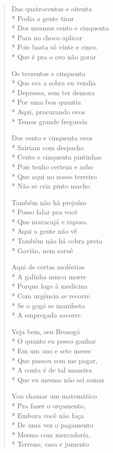 \begin{verse}
Das quatrocentas e oitenta\\*
Podia a gente tirar\\*
Dos mesmos cento e cinquenta\\*
Para no choco aplicar\\*
Pois basta só vinte e cinco\\*
Que é pra o ovo não gorar

Os trezentos e cinquenta\\*
Que era a sobra eu vendia\\*
Depressa, sem ter demora\\*
Por uma boa quantia\\*
Aqui, procurando ovos\\*
Temos grande freguesia

Dos cento e cinquenta ovos\\*
Sairiam com despacho\\*
Cento e cinquenta pintinhas\\*
Pois tenho certeza e acho\\*
Que aqui no nosso terreiro\\*
Não se cria pinto macho

Também não há prejuízo\\*
Posso falar pra você\\*
Que maracajá e raposa\\*
Aqui a gente não vê\\*
Também não há cobra preta\\*
Gavião, nem saruê

Aqui de certas moléstias\\*
A galinha nunca morre\\*
Porque logo à medicina\\*
Com urgência se recorre\\*
Se o gogó se manifesta\\*
A empregada socorre

Veja bem, seu Brosogó\\*
O quanto eu posso ganhar\\*
Em um ano e sete meses\\*
Que passou sem me pagar,\\*
A conta é de tal maneira\\*
Que eu mesmo não sei somar

Vou chamar um matemático\\*
Pra fazer o orçamento,\\*
Embora você não faça\\*
De uma vez o pagamento\\*
Mesmo com mercadoria,\\*
Terreno, casa e jumento


\end{verse}

